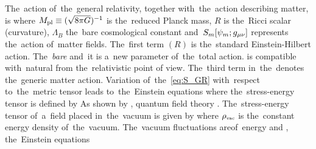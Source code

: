 The~action of~the~general relativity, together with~the~action describing matter, is
where $M_{\text{\scriptsize pl}}\equiv(\sqrt{8\pi G})^{-1}$ is the~reduced Planck mass, $R$ is the~Ricci scalar (curvature), $\Lambda_B$ the~bare cosmological constant and~$S_m[\psi_m;g_{\mu\nu}]$ represents the~action of~matter fields. The~first term $(R)$ is the~standard Einstein-Hilbert action. The~\DIFaddbegin {}\DIFaddend \textit{bare} \DIFdelbegin {}\DIFdelend \DIFaddbegin {}\DIFaddend and~it is \DIFdelbegin {}\DIFdelend \DIFaddbegin {}\DIFaddend a~new parameter of~the~total action. \DIFdelbegin {}\DIFdelend \DIFaddbegin {}\DIFaddend is compatible with~\DIFdelbegin {}\DIFdelend \DIFaddbegin {}\DIFaddend natural from the~relativistic point of \DIFdelbegin \DIFdel{~}\DIFdelend view. The~third term in~the~\DIFdelbegin {}\DIFdelend \DIFaddbegin {}\DIFaddend denotes the~generic matter action. Variation of~the~\DIFdelbegin {}\DIFdelend \DIFaddbegin {}\eqref{eq:S_GR} \DIFaddend with~respect to~the~metric tensor \DIFaddbegin {}\DIFaddend leads to~the~Einstein equations
\DIFdelbegin {}\DIFdelend {}
where the~stress-energy tensor is defined by
As shown by \textcite{1968SPhD...12.1040S}, \DIFdelbegin {}\DIFdelend \DIFaddbegin {}\DIFaddend quantum field theory \DIFdelbegin {}\DIFdelend \DIFaddbegin {}\DIFaddend . The~stress-energy tensor of~a~field placed in~the~vacuum \DIFdelbegin {}\DIFdelend is given by
where $\rho_\text{\tiny vac}$ is the~constant energy density of~the~vacuum. The~vacuum fluctuations are\DIFdelbegin {}\DIFdelend \DIFaddbegin {}\DIFaddend of~energy and \DIFdelbegin {}\DIFdelend \DIFaddbegin {}\DIFaddend ,  the~Einstein equations \DIFdelbegin {}\DIFdelend \DIFaddbegin {}\DIFaddend {}
